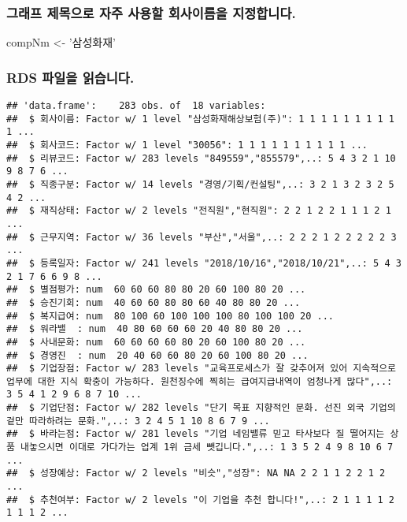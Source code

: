 \documentclass[]{article}
\newenvironment{Shaded}{\begin{snugshade}}{\end{snugshade}}
\newcommand{\StringTok}[1]{\textcolor[rgb]{0.31,0.60,0.02}{#1}}
\newcommand{\NormalTok}[1]{#1}
\begin{document}
\subsubsection{그래프 제목으로 자주 사용할 회사이름을
지정합니다.}\label{-----.}

\begin{Shaded}
\begin{Highlighting}[]
\NormalTok{compNm <-}\StringTok{ '삼성화재'}
\end{Highlighting}
\end{Shaded}

\subsubsection{RDS 파일을 읽습니다.}\label{rds--.}

\begin{verbatim}
## 'data.frame':    283 obs. of  18 variables:
##  $ 회사이름: Factor w/ 1 level "삼성화재해상보험(주)": 1 1 1 1 1 1 1 1 1 1 ...
##  $ 회사코드: Factor w/ 1 level "30056": 1 1 1 1 1 1 1 1 1 1 ...
##  $ 리뷰코드: Factor w/ 283 levels "849559","855579",..: 5 4 3 2 1 10 9 8 7 6 ...
##  $ 직종구분: Factor w/ 14 levels "경영/기획/컨설팅",..: 3 2 1 3 2 3 2 5 4 2 ...
##  $ 재직상태: Factor w/ 2 levels "전직원","현직원": 2 2 1 2 2 1 1 1 2 1 ...
##  $ 근무지역: Factor w/ 36 levels "부산","서울",..: 2 2 2 1 2 2 2 2 2 3 ...
##  $ 등록일자: Factor w/ 241 levels "2018/10/16","2018/10/21",..: 5 4 3 2 1 7 6 6 9 8 ...
##  $ 별점평가: num  60 60 60 80 80 20 60 100 80 20 ...
##  $ 승진기회: num  40 60 60 80 80 60 40 80 80 20 ...
##  $ 복지급여: num  80 100 60 100 100 100 80 100 100 20 ...
##  $ 워라밸  : num  40 80 60 60 60 20 40 80 80 20 ...
##  $ 사내문화: num  60 60 60 60 80 20 60 100 80 20 ...
##  $ 경영진  : num  20 40 60 60 80 20 60 100 80 20 ...
##  $ 기업장점: Factor w/ 283 levels "교육프로세스가 잘 갖추어져 있어 지속적으로 업무에 대한 지식 확충이 가능하다. 원천징수에 찍히는 급여지급내역이 엄청나게 많다",..: 3 5 4 1 2 9 6 8 7 10 ...
##  $ 기업단점: Factor w/ 282 levels "단기 목표 지향적인 문화. 선진 외국 기업의 겉만 따라하려는 문화.",..: 3 2 4 5 1 10 8 6 7 9 ...
##  $ 바라는점: Factor w/ 281 levels "기업 네임밸류 믿고 타사보다 질 떨어지는 상품 내놓으시면 이대로 가다가는 업계 1위 금세 뺏깁니다.",..: 1 3 5 2 4 9 8 10 6 7 ...
##  $ 성장예상: Factor w/ 2 levels "비슷","성장": NA NA 2 2 1 1 2 2 1 2 ...
##  $ 추천여부: Factor w/ 2 levels "이 기업을 추천 합니다!",..: 2 1 1 1 1 2 1 1 1 2 ...
\end{verbatim}
\end{document}
